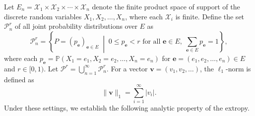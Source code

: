 \documentclass[pdflatex]{sn-jnl}%
\theoremstyle{thmstyleone}
\theoremstyle{thmstyletwo}%
\theoremstyle{thmstylethree}%
\begin{document}


Let $E_n = \mathcal{X}_1 \times \mathcal{X}_2 \times \cdots \times \mathcal{X}_n$ denote the finite product space of support of the discrete random variables \( X_1, X_2, \dots, X_n \), where each $\mathcal{X}_i$ is finite. Define the set \( \mathcal{P}^r_n \) of all joint probability distributions over \( E \) as
\[
\mathcal{P}^r_n = \left\{ P = (p_{\mathbf{e}})_{\mathbf{e} \in E} \;\middle|\; 0 \leq p_{\mathbf{e}} < r \text{ for all } \mathbf{e} \in E,\; \sum_{\mathbf{e} \in E} p_{\mathbf{e}} = 1 \right\},
\]
where each \( p_{\mathbf{e}} = \mathbb{P}(X_1 = e_1, X_2 = e_2, \dots, X_n = e_n) \) for \( \mathbf{e} = (e_1, e_2, \dots, e_n) \in E \) and $r\in [0,1)$. Let $\mathcal{P}^r=\bigcup_{n=1}^{\infty}\mathcal{P}_n^r$. For a vector \( \bm{{v}} = (v_1, v_2, \ldots) \), the \( \ell_1 \)-norm is defined as
\[
\|\bm{{v}}\|_1 = \sum_{i=1}^{\infty} |v_i|.
\]
Under these settings, we establish the following analytic property of the extropy.
\end{document}
